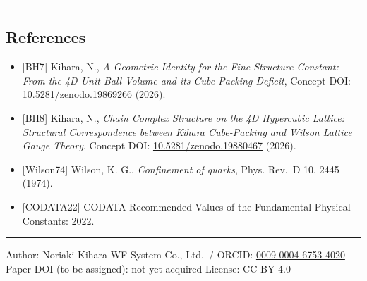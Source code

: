 \documentclass[
]{article}
\providecommand{\tightlist}{%
  \setlength{\itemsep}{0pt}\setlength{\parskip}{0pt}}
\begin{document}
\begin{center}\rule{0.5\linewidth}{0.5pt}\end{center}

\subsection{References}\label{references}

\begin{itemize}
\tightlist
\item
  {[}BH7{]} Kihara, N., \emph{A Geometric Identity for the
  Fine-Structure Constant: From the 4D Unit Ball Volume and its
  Cube-Packing Deficit}, Concept DOI:
  \href{https://doi.org/10.5281/zenodo.19869266}{10.5281/zenodo.19869266}
  (2026).
\item
  {[}BH8{]} Kihara, N., \emph{Chain Complex Structure on the 4D
  Hypercubic Lattice: Structural Correspondence between Kihara
  Cube-Packing and Wilson Lattice Gauge Theory}, Concept DOI:
  \href{https://doi.org/10.5281/zenodo.19880467}{10.5281/zenodo.19880467}
  (2026).
\item
  {[}Wilson74{]} Wilson, K. G., \emph{Confinement of quarks}, Phys.
  Rev.~D 10, 2445 (1974).
\item
  {[}CODATA22{]} CODATA Recommended Values of the Fundamental Physical
  Constants: 2022.
\end{itemize}

\begin{center}\rule{0.5\linewidth}{0.5pt}\end{center}

Author: Noriaki Kihara WF System Co., Ltd.~/ ORCID:
\href{https://orcid.org/0009-0004-6753-4020}{0009-0004-6753-4020} Paper
DOI (to be assigned): not yet acquired License: CC BY 4.0
\end{document}
